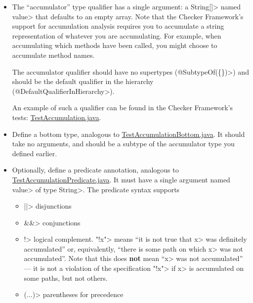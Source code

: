 \begin{itemize}
\item
The ``accumulator'' type qualifier has a single argument: a \<String[]> named
\<value> that defaults to an empty array.  Note that the Checker Framework's
support for accumulation analysis requires you to accumulate a string representation
of whatever you are accumulating. For example, when accumulating which methods have
been called, you might choose to accumulate method names.

The accumulator
qualifier should have no supertypes (\<@SubtypeOf(\{\})>) and should
be the default qualifier in the hierarchy (\<@DefaultQualifierInHierarchy>).

An example of such a qualifier can be found in the Checker Framework's tests:
\href{https://github.com/typetools/checker-framework/blob/master/framework/src/test/java/org/checkerframework/framework/testchecker/testaccumulation/qual/TestAccumulation.java}{TestAccumulation.java}.

\item
Define a bottom type, analogous to
\href{https://github.com/typetools/checker-framework/blob/master/framework/src/test/java/org/checkerframework/framework/testchecker/testaccumulation/qual/TestAccumulationBottom.java}{TestAccumulationBottom.java}.
It should take no arguments, and should be a subtype of the accumulator type you defined earlier.

\item
Optionally, define a predicate annotation, analogous to
\href{https://github.com/typetools/checker-framework/blob/master/framework/src/test/java/org/checkerframework/framework/testchecker/testaccumulation/qual/TestAccumulationPredicate.java}{TestAccumulationPredicate.java}.
It must have a single argument named \<value> of type \<String>.
The predicate syntax supports
\begin{itemize}
\item \<||> disjunctions
\item \<\&\&> conjunctions
\item \<!> logical complement.  \<"!x"> means
``it is not true that \<x> was definitely accumulated'' or, equivalently, ``there is some path on which \<x> was not accumulated''.
Note that this does \textbf{not} mean ``\<x> was not accumulated'' --- it is not a violation of the specification \<"!x"> if \<x> is accumulated
on some paths, but not others.
\item \<(...)> parentheses for precedence
\end{itemize}

\end{itemize}

